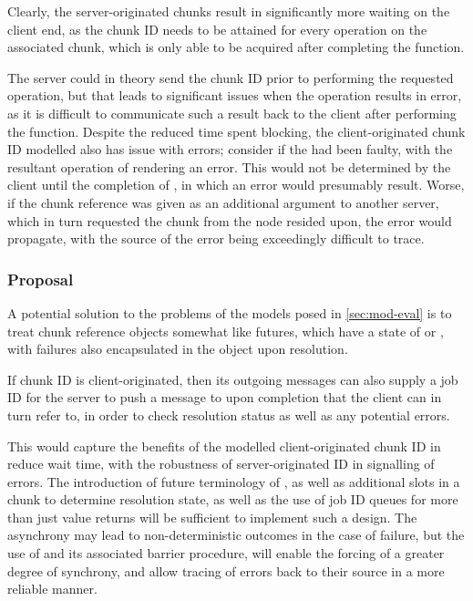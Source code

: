 Clearly, the server-originated chunks result in significantly more waiting on the client end, as the chunk ID needs to be attained for every operation on the associated chunk, which is only able to be acquired after completing the function.

The server could in theory send the chunk ID prior to performing the requested operation, but that leads to significant issues when the operation results in error, as it is difficult to communicate such a result back to the client after performing the function.
Despite the reduced time spent blocking, the client-originated chunk ID modelled also has issue with errors; consider if the  had been faulty, with the resultant operation of  rendering an error.
This would not be determined by the client until the completion of , in which an error would presumably result.
Worse, if the chunk reference  was given as an additional argument to another server, which in turn requested the chunk  from the node  resided upon, the error would propagate, with the source of the error being exceedingly difficult to trace.

\subsubsection{Proposal}

A potential solution to the problems of the models posed in \cref{sec:mod-eval} is to treat chunk reference objects somewhat like futures, which have a state of  or , with failures also encapsulated in the object upon resolution\cite{bengtsson20:future-r}.

If chunk ID is client-originated, then its outgoing messages can also supply a job ID for the server to push a message to upon completion that the client can in turn refer to, in order to check resolution status as well as any potential errors.

This would capture the benefits of the modelled client-originated chunk ID in reduce wait time, with the robustness of server-originated ID in signalling of errors.
The introduction of future terminology of , as well as additional slots in a chunk to determine resolution state, as well as the use of job ID queues for more than just value returns will be sufficient to implement such a design.
The asynchrony may lead to non-deterministic outcomes in the case of failure, but the use of  and its associated barrier procedure,  will enable the forcing of a greater degree of synchrony, and allow tracing of errors back to their source in a more reliable manner.

